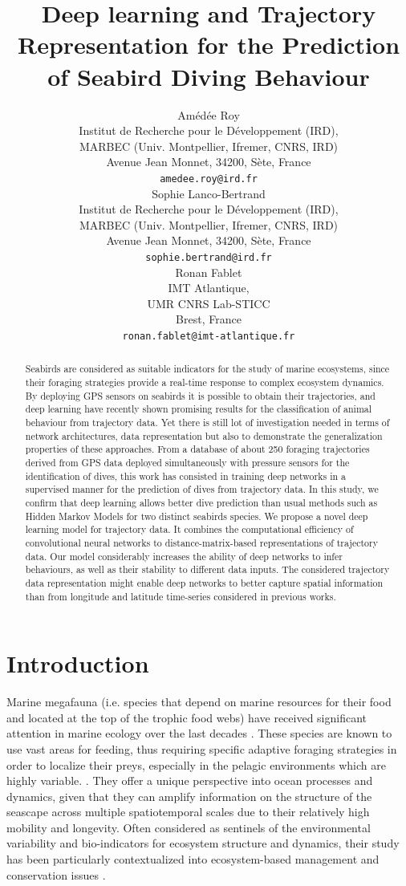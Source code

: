 \documentclass{article}
\title{Deep learning and Trajectory Representation for the Prediction of Seabird Diving Behaviour}
\author{
  Amédée Roy \\
  Institut de Recherche pour le Développement (IRD),\\
  MARBEC (Univ. Montpellier, Ifremer, CNRS, IRD)\\
  Avenue Jean Monnet, 34200, Sète, France \\
  \texttt{amedee.roy@ird.fr} \\
   \And
  Sophie Lanco-Bertrand \\
  Institut de Recherche pour le Développement (IRD),\\
  MARBEC (Univ. Montpellier, Ifremer, CNRS, IRD)\\
  Avenue Jean Monnet, 34200, Sète, France \\
  \texttt{sophie.bertrand@ird.fr} \\
  \And
  Ronan Fablet \\
  IMT Atlantique,\\
  UMR CNRS Lab-STICC\\
  Brest, France \\
  \texttt{ronan.fablet@imt-atlantique.fr} \\
}
\begin{document}
\maketitle
\linenumbers
\doublespacing


\begin{abstract}
Seabirds are considered as suitable indicators for the study of marine ecosystems, since their foraging strategies provide a real-time response to complex ecosystem dynamics. By deploying GPS sensors on seabirds it is  possible to obtain their trajectories, and deep learning have recently shown promising results for the classification of animal behaviour from trajectory data. Yet there is still lot of investigation needed in terms of network architectures, data representation but also to demonstrate the generalization properties of these approaches. From a database of about 250 foraging trajectories derived from GPS data deployed simultaneously with pressure sensors for the identification of dives, this work has consisted in training deep networks in a supervised manner for the prediction of dives from trajectory data. In this study, we confirm that deep learning allows better dive prediction than usual methods such as Hidden Markov Models for two distinct seabirds species. We propose a novel deep learning model for trajectory data. It combines the computational efficiency of convolutional neural networks to distance-matrix-based representations of trajectory data. Our model considerably increases the ability of deep networks to infer behaviours, as well as their stability to different data inputs. The considered trajectory data representation might enable deep networks to better capture spatial information than from longitude and latitude time-series considered in previous works.
\end{abstract}


\newpage

\section{Introduction}
Marine megafauna (i.e. species that depend on marine resources for their food and located at the top of the trophic food webs) have received significant attention in marine ecology over the last decades \cite{authier_conservation_2017}.
These species are known to use vast areas for feeding, thus requiring specific adaptive foraging strategies in order to localize their preys, especially in the pelagic environments which are highly variable. \cite{hazen_marine_2019}.
They offer a unique perspective into ocean processes and dynamics, given that they can  amplify  information on the structure of the seascape across  multiple spatiotemporal scales due to their relatively high mobility and longevity.
Often considered as sentinels of the environmental variability and bio-indicators for ecosystem structure and dynamics, their study has been particularly contextualized into ecosystem-based management and conservation issues \cite{lascelles_migratory_2014, hooker_marine_2004}.
\end{document}
